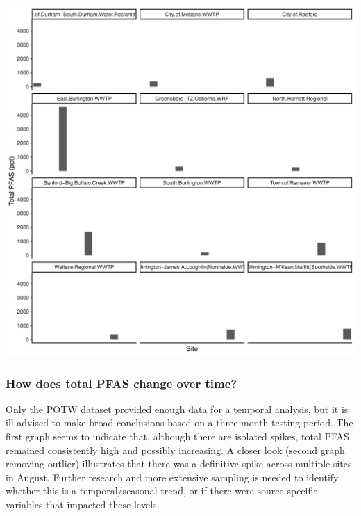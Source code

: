 \documentclass[
  12pt,
]{article}
\begin{document}
\includegraphics{PFAS_FinalProject_files/figure-latex/unnamed-chunk-23-1.pdf}

\hypertarget{how-does-total-pfas-change-over-time}{%
\subsubsection{How does total PFAS change over
time?}\label{how-does-total-pfas-change-over-time}}

Only the POTW dataset provided enough data for a temporal analysis, but
it is ill-advised to make broad conclusions based on a three-month
testing period. The first graph seems to indicate that, although there
are isolated spikes, total PFAS remained consistently high and possibly
increasing. A closer look (second graph removing outlier) illustrates
that there was a definitive spike across multiple sites in August.
Further research and more extensive sampling is needed to identify
whether this is a temporal/seasonal trend, or if there were
source-specific variables that impacted these levels.
\end{document}
